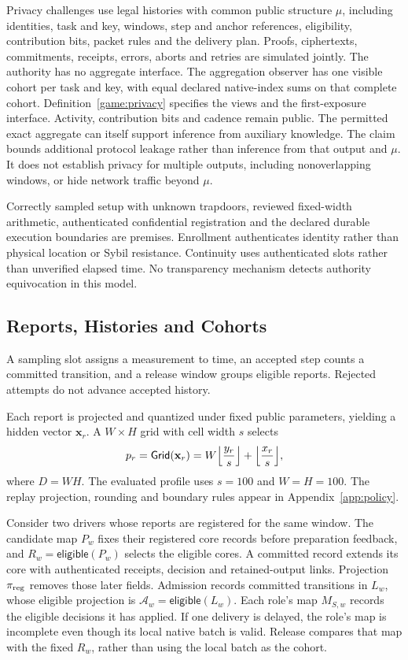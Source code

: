 \documentclass[conference,compsoc]{IEEEtran}
\theoremstyle{definition}
\numberwithin{equation}{section}
\numberwithin{table}{section}
\numberwithin{figure}{section}
\theoremstyle{plain}
\begin{document}
Privacy challenges use legal histories with common public structure \(\mu\),
including identities, task and key, windows, step and anchor references,
eligibility, contribution bits, packet rules and the delivery plan. Proofs,
ciphertexts, commitments, receipts, errors, aborts and retries are simulated
jointly. The authority has no aggregate interface. The aggregation observer
has one visible cohort per task and key, with equal declared native-index sums
on that complete cohort. Definition~\ref{game:privacy} specifies the views and
the first-exposure interface. Activity, contribution bits and cadence remain public. The permitted
exact aggregate can itself support inference from auxiliary knowledge. The
claim bounds additional protocol leakage rather than inference from that
output and \(\mu\). It does not establish privacy for multiple outputs, including nonoverlapping
windows, or hide network traffic beyond \(\mu\).

Correctly sampled setup with unknown trapdoors, reviewed fixed-width
arithmetic, authenticated confidential registration and the declared durable
execution boundaries are premises. Enrollment authenticates identity rather
than physical location or Sybil resistance. Continuity uses authenticated
slots rather than unverified elapsed time. No transparency mechanism detects
authority equivocation in this model.

\subsection{Reports, Histories and Cohorts}
\label{sec:prelim-model}

A sampling slot assigns a measurement to time, an accepted step counts a
committed transition, and a release window groups eligible reports. Rejected
attempts do not advance accepted history.

Each report is projected and quantized under fixed public parameters, yielding
a hidden vector \(\mathbf{x}_r\). A \(W\times H\) grid with cell width \(s\)
selects
\begin{equation}
  p_r=\mathsf{Grid}(\mathbf{x}_r)
  =W\Bigl\lfloor\frac{y_r}{s}\Bigr\rfloor+\Bigl\lfloor\frac{x_r}{s}\Bigr\rfloor,
  \label{eq:canonical-grid}
\end{equation}
where \(D=WH\). The evaluated profile uses \(s=100\) and \(W=H=100\).
The replay projection, rounding and boundary rules appear in
Appendix~\ref{app:policy}.

Consider two drivers whose reports are registered for the same window. The
candidate map \(P_w\) fixes their registered core records before preparation
feedback, and \(R_w=\mathsf{eligible}(P_w)\) selects the eligible cores. A
committed record extends its core with authenticated receipts, decision and
retained-output links. Projection \(\pi_{\rm reg}\) removes those later fields. Admission records committed transitions in \(L_w\), whose
eligible projection is \(\mathcal A_w=\mathsf{eligible}(L_w)\). Each role's
map \(M_{S,w}\) records the eligible decisions it has applied. If one
delivery is delayed, the role's map is incomplete even though its local native
batch is valid. Release compares that map with the fixed \(R_w\), rather than
using the local batch as the cohort.
\end{document}
